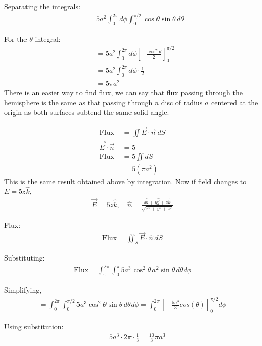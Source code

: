 \documentclass{article}
\begin{document}
Separating the integrals:
\begin{align*}
&= 5a^2 \int_{0}^{2\pi} d\phi \int_{0}^{\pi/2} \cos{\theta} \sin{\theta} \, d\theta
\end{align*}

For the $\theta$ integral:
\begin{align*}
&= 5a^2 \int_{0}^{2\pi} d\phi \left[ -\frac{\cos^2{\theta}}{2} \right]_{0}^{\pi/2} \\
&= 5a^2 \int_{0}^{2\pi} d\phi \cdot \frac{1}{2} \\
&= 5\pi a^2
\end{align*}
There is an easier way to find flux, we can say that flux passing through the hemisphere is the same as that passing through a disc of radius $a$ centered at
the origin as both surfaces subtend the same solid angle.

\begin{align*}
\text{Flux} &= \iint \vec{E} \cdot \vec{n} \, dS \\
\vec{E} \cdot \vec{n} & = 5 \\
\text{Flux } &= 5 \iint dS \\
& = 5 (\pi a^2)
\end{align*}
This is the same result obtained above by integration. Now if field changes to $E = 5z\hat{k}$,
\begin{align*}
\vec{E} = 5z \hat{k}, \quad \hat{n} = \frac{x \hat{i} + y \hat{j} + z \hat{k}}{\sqrt{x^2 + y^2 + z^2}}
\end{align*}

Flux:
\begin{align*}
\text{Flux} = \iint_S \vec{E} \cdot \hat{n} \, dS
\end{align*}

Substituting:
\begin{align*}
\text{Flux} = \int_0^{2\pi} \int_0^{\pi} 5a^3 \cos^2\theta \, a^2 \sin\theta \, d\theta d\phi
\end{align*}

Simplifying,
\begin{align*}
= \int_0^{2\pi}  \int_0^{\pi/2} 5a^3 \cos^2\theta \sin\theta \, d\theta d\phi
= \int_0^{2\pi}   \left[-\frac{5a^3}{3} cos(\theta)\right]_0^{\pi/2} d\phi
\end{align*}

Using substitution:
\begin{align*}
= 5a^3 \cdot 2\pi \cdot \frac{1}{3}
= \frac{10}{3}\pi a^3
\end{align*}

\vspace{1cm}
\end{document}
